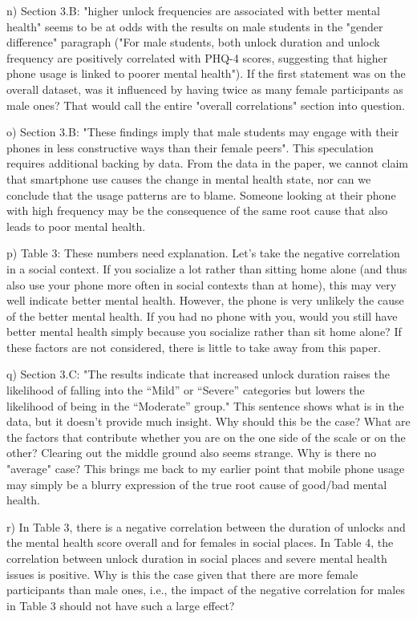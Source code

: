 n) Section 3.B: "higher unlock frequencies are associated with better mental health" seems to be at odds with the results on male students in the "gender difference" paragraph ("For male students, both unlock duration and unlock frequency are positively correlated with PHQ-4 scores, suggesting that higher phone usage is linked to poorer mental health"). If the first statement was on the overall dataset, was it influenced by having twice as many female participants as male ones? That would call the entire "overall correlations" section into question.

o) Section 3.B: "These findings imply that male students may engage with their phones in less constructive ways than their female peers". This speculation requires additional backing by data. From the data in the paper, we cannot claim that smartphone use causes the change in mental health state, nor can we conclude that the usage patterns are to blame. Someone looking at their phone with high frequency may be the consequence of the same root cause that also leads to poor mental health.

p) Table 3: These numbers need explanation. Let's take the negative correlation in a social context. If you socialize a lot rather than sitting home alone (and thus also use your phone more often in social contexts than at home), this may very well indicate better mental health. However, the phone is very unlikely the cause of the better mental health. If you had no phone with you, would you still have better mental health simply because you socialize rather than sit home alone? If these factors are not considered, there is little to take away from this paper.

q) Section 3.C: "The results indicate that increased unlock duration raises the likelihood of falling into the “Mild” or “Severe” categories but lowers the likelihood of being in the “Moderate” group." This sentence shows what is in the data, but it doesn't provide much insight. Why should this be the case? What are the factors that contribute whether you are on the one side of the scale or on the other? Clearing out the middle ground also seems strange. Why is there no "average" case? This brings me back to my earlier point that mobile phone usage may simply be a blurry expression of the true root cause of good/bad mental health.

r) In Table 3, there is a negative correlation between the duration of unlocks and the mental health score overall and for females in social places. In Table 4, the correlation between unlock duration in social places and severe mental health issues is positive. Why is this the case given that there are more female participants than male ones, i.e., the impact of the negative correlation for males in Table 3 should not have such a large effect?



